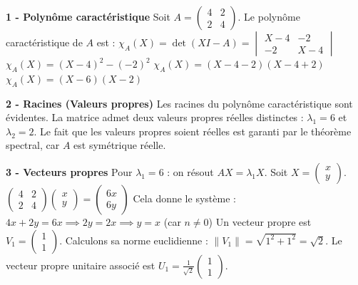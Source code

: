 \documentclass[11pt,a4paper]{article}
\begin{document}
\textbf{1 - Polynôme caractéristique}
Soit $A = \begin{pmatrix} 4 & 2 \\ 2 & 4 \end{pmatrix}$.
Le polynôme caractéristique de $A$ est :
$\chi_A(X) = \det(X I - A) = \begin{vmatrix} X - 4 & -2 \\ -2 & X - 4 \end{vmatrix}$
$\chi_A(X) = (X - 4)^2 - (-2)^2$
$\chi_A(X) = (X - 4 - 2)(X - 4 + 2)$
$\chi_A(X) = (X - 6)(X - 2)$

\textbf{2 - Racines (Valeurs propres)}
Les racines du polynôme caractéristique sont évidentes. La matrice admet deux valeurs propres réelles distinctes :
$\lambda_1 = 6$ et $\lambda_2 = 2$.
Le fait que les valeurs propres soient réelles est garanti par le théorème spectral, car $A$ est symétrique réelle.

\textbf{3 - Vecteurs propres}
Pour $\lambda_1 = 6$ : on résout $AX = \lambda_1 X$.
Soit $X = \begin{pmatrix} x \\ y \end{pmatrix}$.
$\begin{pmatrix} 4 & 2 \\ 2 & 4 \end{pmatrix} \begin{pmatrix} x \\ y \end{pmatrix} = \begin{pmatrix} 6x \\ 6y \end{pmatrix}$
Cela donne le système :
$4x + 2y = 6x \implies 2y = 2x \implies y = x$ (car $n \neq 0$)
Un vecteur propre est $V_1 = \begin{pmatrix} 1 \\ 1 \end{pmatrix}$.
Calculons sa norme euclidienne : $\|V_1\| = \sqrt{1^2 + 1^2} = \sqrt{2}$.
Le vecteur propre unitaire associé est $U_1 = \frac{1}{\sqrt{2}} \begin{pmatrix} 1 \\ 1 \end{pmatrix}$.
\end{document}
